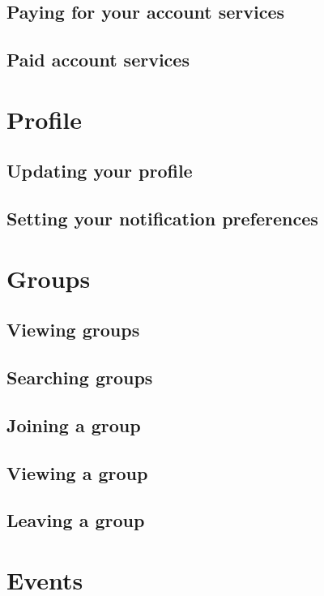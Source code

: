 \documentclass[a4paper,11pt,titlepage]{scrartcl}
\begin{document}
\subsection{Paying for your account services}

\subsection{Paid account services}

\clearpage
\section{Profile}

\subsection{Updating your profile}

\subsection{Setting your notification preferences}

\clearpage
\section{Groups}

\subsection{Viewing groups}

\subsection{Searching groups}

\subsection{Joining a group}

\subsection{Viewing a group}

\subsection{Leaving a group}

\clearpage
\section{Events}
\end{document}
